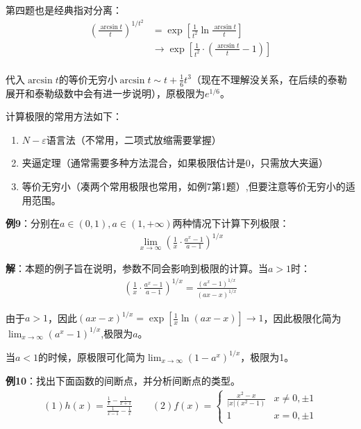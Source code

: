 \documentclass{ctexart}
\let\oldtextbf\textbf %
\renewcommand{\textbf}[1]{\textcolor{btex}{\oldtextbf{#1}}} %
\begin{document}
第四题也是经典指对分离：
\begin{align*}
   (\frac{\arcsin t}{t})^{1/t^2}&=\exp\left[\frac{1}{t^2}\ln \frac{\arcsin t}{t}\right]\\
   &\to \exp[\frac{1}{t^2}\cdot (\frac{\arcsin t}{t}-1)]\\
\end{align*}

代入$\arcsin t$的等价无穷小$\arcsin t\sim t+\frac{1}{6}t^3$（现在不理解没关系，在后续的泰勒展开和泰勒级数中会有进一步说明），原极限为$e^{1/6}$。

\begin{tcolorbox}[
    colback=bac1,     %
    colframe=fra1,   %
    coltitle=white,             %
    coltext=tex1,
    title=序列极限和函数极限的计算,
    fonttitle=\bfseries,        %
arc=3mm,                     %
breakable
]
计算极限的常用方法如下：
\begin{enumerate}
    \item $N-\varepsilon$语言法（不常用，二项式放缩需要掌握）
    \item 夹逼定理（通常需要多种方法混合，如果极限估计是0，只需放大夹逼）
    \item 等价无穷小（凑两个常用极限也常用，如例7第1题）,但要注意等价无穷小的适用范围。
\end{enumerate}
\end{tcolorbox}

\textbf{例9}：分别在$a\in(0,1),a\in (1,+\infty)$两种情况下计算下列极限：
\begin{align*}
    \lim_{x\to\infty}\left(\frac{1}{x}\cdot\frac{a^x-1}{a-1}\right)^{1/x}
\end{align*}

\textbf{解}：本题的例子旨在说明，参数不同会影响到极限的计算。当$a>1$时：
\begin{align*}
    \left(\frac{1}{x}\cdot\frac{a^x-1}{a-1}\right)^{1/x}=\frac{(a^x-1)^{1/x}}{(ax-x)^{1/x}}
\end{align*}

由于$a>1$，因此$(ax-x)^{1/x}=\exp [\frac{1}{x}\ln(ax-x)]\to 1$，因此极限化简为$\lim_{x\to\infty}(a^x-1)^{1/x}$,极限为$a$。

当$a<1$的时候，原极限可化简为$\lim_{x\to\infty}(1-a^x)^{1/x}$，极限为1。

\textbf{例10}：找出下面函数的间断点，并分析间断点的类型。
\begin{align*}
(1) h(x)=\frac{\frac{1}{x}-\frac{1}{x+1}}{\frac{1}{x-1}-\frac{1}{x}}\qquad (2) f(x)=\begin{cases}
\frac{x^2-x}{|x|(x^2-1)} & x\neq 0,\pm 1 \\
1 & x=0,\pm 1
\end{cases} 
\end{align*}
\end{document}
